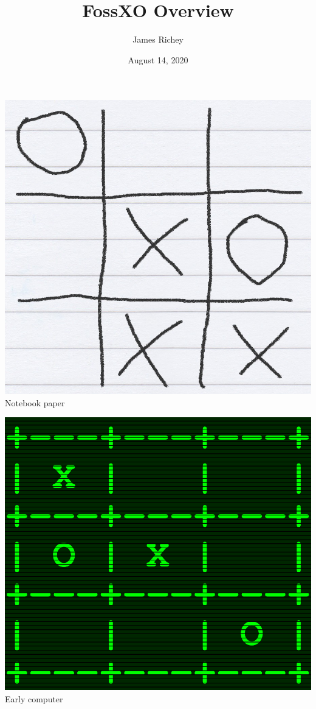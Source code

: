\documentclass{tufte-handout}
\title{FossXO Overview}
\author{James Richey}
\date{August 14, 2020}
\begin{document}
\maketitle


\begin{marginfigure}
  \includegraphics[width=\linewidth]{img/concept-art/paper}
  Notebook paper
\end{marginfigure}

\begin{marginfigure}
  \includegraphics[width=\linewidth]{img/concept-art/computer}
  Early computer
\end{marginfigure}
\end{document}
